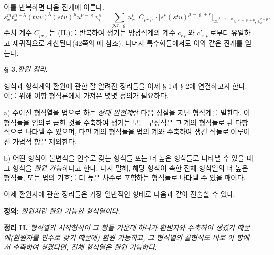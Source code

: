 이를 반복하면 다음 전개에 이른다.
\[
\tag{III}
s_x^m t_x^{n-\lambda}(tuv)^\lambda(stu)^\mu u_\tau^{\nu-\varkappa}v_\tau^\varkappa
=
\sum_{p,r,\varrho}u_x^p\cdot C_{pr\varrho}\cdot
\bigl[s_\tau^\varrho(stu)^{\mu-\varrho+r}\bigr]_{\widehat{uv}^{\lambda-r+\varrho}v^{\varkappa-\varrho+p},\,v_x^{r-p}}.
\]
수치 계수 $C_{pr\varrho}$는 (II.)를 반복하여 생기는 방정식계의 계수 $c_{r\varrho}$와 $c'_{r\varrho}$로부터 유일하고 재귀적으로 계산된다(42쪽의 예 참조). 나머지 특수화들에서도 이와 같은 전개를 얻는다.

\begin{center}
\textbf{§ 3.}\quad \emph{환원 정리.}
\end{center}

형식과 형식계의 환원에 관한 잘 알려진 정리들을 이제 § 1과 § 2에 연결하고자 한다. 이를 위해 이항 형식론에서 가져온 몇몇 정의가 필요하다.

a) 주어진 형식열을 법으로 하는 \emph{상대 완전계}란 다음 성질을 지닌 형식계를 말한다. 이 형식들을 임의로 곱한 것을 수축하여 생기는 모든 구성식은 그 계의 형식들로 된 다항식으로 나타낼 수 있으며, 다만 계의 형식들을 법의 계와 수축하여 생긴 식들로 이루어진 가법적 항은 제외한다.

b) 어떤 형식이 불변식을 인수로 갖는 형식들 또는 \glqq{}더 높은 형식들\grqq{}로 나타낼 수 있을 때 그 형식을 \emph{환원 가능}하다고 한다. 다시 말해, 해당 형식이 속한 전체 형식열의 더 높은 형식들, 또는 법의 기호를 더 높은 차수로 포함하는 형식들로 나타낼 수 있을 때이다.

이제 환원자에 관한 정리들은 가장 일반적인 형태로 다음과 같이 진술할 수 있다.

\textbf{정의:} \emph{환원자란 환원 가능한 형식열이다.}

\textbf{정리 II.} \emph{형식열의 시작형식이 그 항들 가운데 하나가 환원자와 수축하여 생겼기 때문에(환원자를 인수로 갖기 때문에) 환원 가능하고, 그 형식열의 끝형식도 바로 이 항에서 수축하여 생겼다면, 전체 형식열은 환원 가능하다}.

